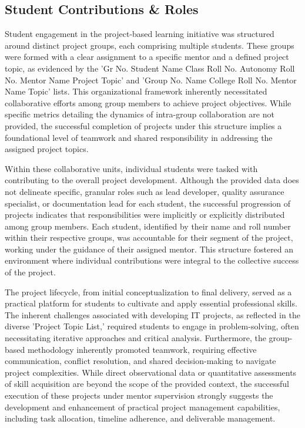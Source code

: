 \documentclass[11pt,a4paper]{article}
\newenvironment{card}{
    \begin{tcolorbox}[
        enhanced,
        colback=cardback,
        colframe=border,
        sharp corners,
        boxrule=0.5pt,
        drop shadow,
        drop shadow={shadow xshift=1mm,shadow yshift=-1mm,fill=border!50},
        boxsep=3mm,
        left=5mm, right=5mm, top=5mm, bottom=5mm,
        width=\textwidth,
        nobeforeafter
    ]
}{\end{tcolorbox}}
\begin{document}
\vspace{0.5cm}

\begin{card}
    \subsection*{\textcolor{accent}{Student Contributions \& Roles}}
    \vspace{0.3cm}
    Student engagement in the project-based learning initiative was structured around distinct project groups, each comprising multiple students. These groups were formed with a clear assignment to a specific mentor and a defined project topic, as evidenced by the 'Gr No. Student Name Class Roll No. Autonomy Roll No. Mentor Name Project Topic' and 'Group No. Name College Roll No. Mentor Name Topic' lists. This organizational framework inherently necessitated collaborative efforts among group members to achieve project objectives. While specific metrics detailing the dynamics of intra-group collaboration are not provided, the successful completion of projects under this structure implies a foundational level of teamwork and shared responsibility in addressing the assigned project topics.

    Within these collaborative units, individual students were tasked with contributing to the overall project development. Although the provided data does not delineate specific, granular roles such as lead developer, quality assurance specialist, or documentation lead for each student, the successful progression of projects indicates that responsibilities were implicitly or explicitly distributed among group members. Each student, identified by their name and roll number within their respective groups, was accountable for their segment of the project, working under the guidance of their assigned mentor. This structure fostered an environment where individual contributions were integral to the collective success of the project.

    The project lifecycle, from initial conceptualization to final delivery, served as a practical platform for students to cultivate and apply essential professional skills. The inherent challenges associated with developing IT projects, as reflected in the diverse 'Project Topic List,' required students to engage in problem-solving, often necessitating iterative approaches and critical analysis. Furthermore, the group-based methodology inherently promoted teamwork, requiring effective communication, conflict resolution, and shared decision-making to navigate project complexities. While direct observational data or quantitative assessments of skill acquisition are beyond the scope of the provided context, the successful execution of these projects under mentor supervision strongly suggests the development and enhancement of practical project management capabilities, including task allocation, timeline adherence, and deliverable management.
\end{card}
\end{document}
